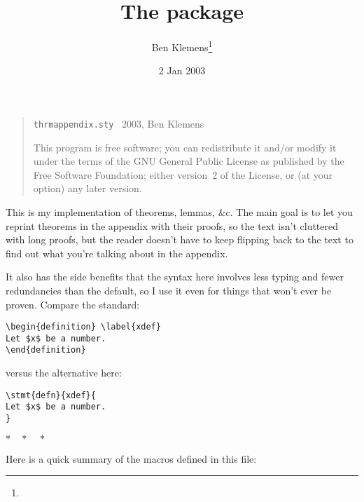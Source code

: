 \documentclass[pagesize=auto]{scrartcl}
\title{The \pkg{thrmappendix} package}
\author{Ben Klemens\thanks{\mail{b@avocado.caltech.edu}}}
\date{2 Jan 2003}
\makeatletter
\newcommand*{\secbreak}{\par\medskip\centerline{$*\quad*\quad*$}\par\medskip}
\newcommand*{\cs}[1]{\texttt{\textbackslash#1}}
\newcommand*{\cmd}[1]{\cs{\expandafter\@gobble\string#1}}
\newcommand*{\meta}[1]{\textlangle\textsl{#1}\textrangle}
\newcommand*{\marg}[1]{\texttt{\{}\meta{#1}\texttt{\}}}
\makeatother
\begin{document}
\maketitle

\begin{quote}
  \footnotesize
  \texttt{thrmappendix.sty} \textcopyright~2003, Ben Klemens

  This program is free software; you can redistribute it and/or modify
  it under the terms of the GNU General Public License as published by
  the Free Software Foundation; either version~2 of the License, or
  (at your option) any later version.
\end{quote}

\noindent
This is my implementation of theorems, lemmas, \&c.  The main goal is
to let you reprint theorems in the appendix with their proofs, so the
text isn't cluttered with long proofs, but the reader doesn't have to
keep flipping back to the text to find out what you're talking about in
the appendix.

It also has the side benefits that the syntax here involves less typing
and fewer redundancies than the default, so I use it even for things
that won't ever be proven. Compare the standard:
%
\begin{lstlisting}
\begin{definition} \label{xdef} 
Let $x$ be a number.
\end{definition}
\end{lstlisting}
%
versus the alternative here:
%
\begin{lstlisting}
\stmt{defn}{xdef}{
Let $x$ be a number.
}
\end{lstlisting}

\secbreak

Here is a quick summary of the macros defined in this file:
%
\end{document}
